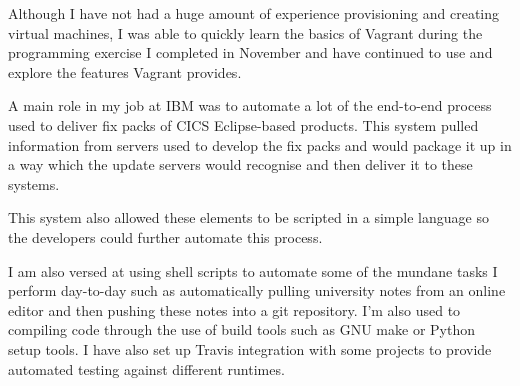 \documentclass[10pt,stdletter,dateno,sigleft]{newlfm} %
\begin{document}
\begin{newlfm}
Although I have not had a huge amount of experience provisioning and creating 
virtual machines, I was able to quickly learn the basics of Vagrant during the
programming exercise I completed in November and have continued to use and 
explore the features Vagrant provides. %

A main role in my job at IBM was to automate a lot of the end-to-end process 
used to deliver fix packs of CICS Eclipse-based products. This system pulled
information from servers used to develop the fix packs and would package it up
in a way which the update servers would recognise and then deliver it to these
systems.

This system also allowed these elements to be scripted in a simple language so
the developers could further automate this process.

I am also versed at using shell scripts to automate some of the mundane tasks
I perform day-to-day such as automatically pulling university notes from an
online editor and then pushing these notes into a git repository. I'm also
used to compiling code through the use of build tools such as GNU make or 
Python setup tools. I have also set up Travis integration with some projects to
provide automated testing against different runtimes.









\end{newlfm}
\end{document}
